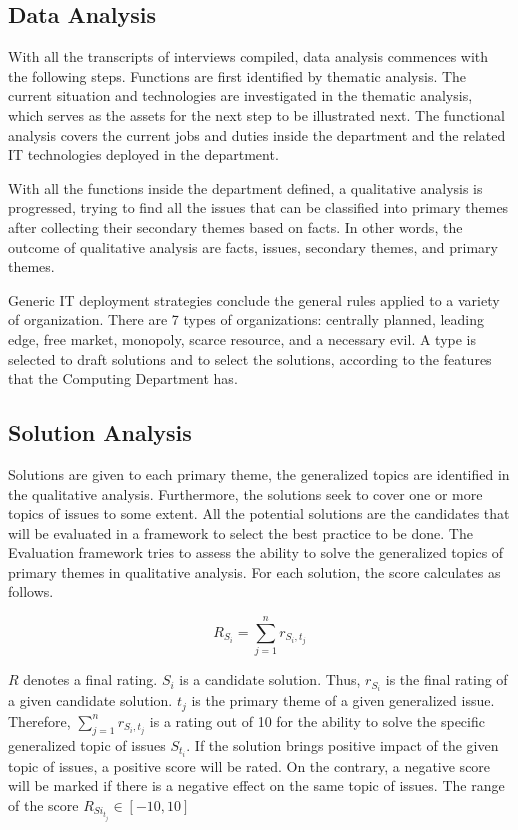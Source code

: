 \subsection{Data Analysis}
With all the transcripts of interviews compiled, data analysis commences with the following steps. 
Functions are first identified by thematic analysis. The current situation and technologies are investigated in the thematic analysis, which serves as the assets for the next step to be illustrated next. The functional analysis covers the current jobs and duties inside the department and the related IT technologies deployed in the department.

With all the functions inside the department defined, a qualitative analysis is progressed, trying to find all the issues that can be classified into primary themes after collecting their secondary themes based on facts. In other words, the outcome of qualitative analysis are facts, issues, secondary themes, and primary themes.

Generic IT deployment strategies conclude the general rules applied to a variety of organization. There are 7 types of organizations: centrally planned, leading edge, free market, monopoly, scarce resource, and a necessary evil. A type is selected to draft solutions and to select the solutions, according to the features that the Computing Department has.

\subsection{Solution Analysis}
Solutions are given to each primary theme, the generalized topics are identified in the qualitative analysis. Furthermore, the solutions seek to cover one or more topics of issues to some extent. All the potential solutions are the candidates that will be evaluated in a framework to select the best practice to be done.
The Evaluation framework tries to assess the ability to solve the generalized topics of primary themes in qualitative analysis. For each solution, the score calculates as follows.

$$
R_{S_i} = \sum_{j=1}^n{r_{S_i, t_j}}
$$

$R$ denotes a final rating. $S_i$ is a candidate solution. Thus, $r_{S_i}$ is the final rating of a given candidate solution. $t_j$ is the primary theme of a given generalized issue. Therefore, $\sum_{j=1}^n{r_{S_i, t_j}}$ is a rating out of 10 for the ability to solve the specific generalized topic of issues $S_{t_i}$. If the solution brings positive impact of the given topic of issues, a positive score will be rated. On the contrary, a negative score will be marked if there is a negative effect on the same topic of issues. The range of the score $R_{Si_{t_j}} \in [-10, 10]$

